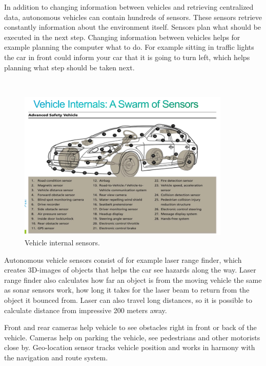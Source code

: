 \documentclass[english]{tktltiki}
\begin{document}
In addition to changing information between vehicles and retrieving centralized 
data, \cite{trafficmodels} autonomous vehicles can contain hundreds of sensors. These sensors 
retrieve constantly information about the environment itself. Sensors plan what 
should be executed in the next step. Changing information between vehicles helps 
for example planning the computer what to do. For example sitting in traffic 
lights the car in front could inform your car that it is going to turn left, 
which helps planning what step should be  taken next. 

\begin{figure}[h]
\ \newline
\begin{center}
\includegraphics[width=0.9\textwidth]{vehicleinternals.png}
\caption{Vehicle internal sensors. 
\cite{connectedvehicle}}
\label{sensors}
\end{center}
\end{figure}

Autonomous vehicle sensors consist of for example laser range finder, which creates 3D-images 
of objects that helps the car see hazards along the way. Laser range finder also calculates 
how far an object is from the moving vehicle the same as sonar sensors work, how long it takes 
for the laser beam to return from the object it bounced from. Laser can also travel long distances, 
so it is possible to calculate distance from impressive 200 meters away.

Front and rear cameras help vehicle to see obstacles right in front or back of the vehicle. Cameras help on parking the vehicle, see pedestrians and other motorists close by. Geo-location sensor tracks vehicle position and works in harmony with the navigation and route system. 
\end{document}
